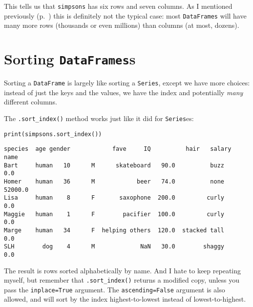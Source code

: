 This tells us that \texttt{simpsons} has six rows and seven columns. As I
mentioned previously (p.~\pageref{tallAndSkinny}) this is definitely not the
typical case: most \texttt{DataFrames} will have many more rows (thousands or
even millions) than columns (at most, dozens).

\section{Sorting \texttt{DataFrames}s}

Sorting a \texttt{DataFrame} is largely like sorting a \texttt{Series}, except
we have more choices: instead of just the keys and the values, we have the
index and potentially \textit{many} different columns.

The \texttt{.sort\_index()} method works just like it did for
\texttt{Series}es:

\begin{samepage}
\begin{Verbatim}[fontsize=\small,samepage=true,frame=single,framesep=3mm]
print(simpsons.sort_index())
\end{Verbatim}
\vspace{-.2in}

\begin{Verbatim}[fontsize=\small,samepage=true,frame=leftline,framesep=5mm,framerule=1mm]
       species  age gender            fave     IQ          hair   salary
name                                                                    
Bart     human   10      M      skateboard   90.0          buzz      0.0
Homer    human   36      M            beer   74.0          none  52000.0
Lisa     human    8      F       saxophone  200.0         curly      0.0
Maggie   human    1      F        pacifier  100.0         curly      0.0
Marge    human   34      F  helping others  120.0  stacked tall      0.0
SLH        dog    4      M             NaN   30.0        shaggy      0.0
\end{Verbatim}
\end{samepage}

The result is rows sorted alphabetically by name. And I hate to keep repeating
myself, but remember that \texttt{.sort\_index()} returns a modified copy,
unless you pass the \texttt{inplace=True} argument. The
\texttt{ascending=False} argument is also allowed, and will sort by the index
highest-to-lowest instead of lowest-to-highest.

